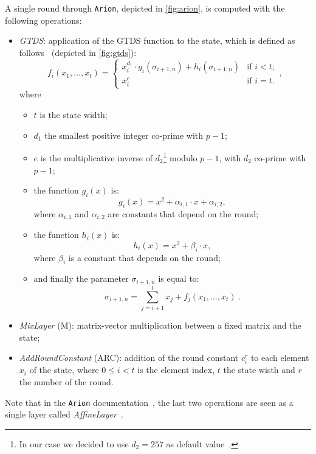 \documentclass[12pt, a4paper]{report}
\begin{document}
A single round through \texttt{Arion}, depicted in \autoref{fig:arion}, is computed with the following operations:
\begin{itemize}
  \item \textit{GTDS}: application of the GTDS function to the state, which is defined as follows~\cite[Def.~1]{arion} (depicted in \autoref{fig:gtds}):
    \begin{equation}
      f_i(x_1, \ldots, x_t) = \left\{
          \begin{array}{ll}
            x_i^{d_1} \cdot g_i(\sigma_{i+1, n}) + h_i(\sigma_{i+1, n}) & \text{if } i < t; \\
            x_i^{e} & \text{if } i = t.
          \end{array}
        \right. ,
      \label{eq:gtds}
    \end{equation}
    where
    \begin{itemize}
      \item $t$ is the state width;
      \item $d_1$ the smallest positive integer co-prime with $p-1$;
      \item $e$ is the multiplicative inverse of $d_2$\footnote{In our case we decided to use $d_2 = 257$ as default value~\cite[Tab.~2]{arion}.} modulo $p-1$, with $d_2$ co-prime with $p-1$;
      \item the function $g_i(x)$ is:
        \begin{equation}
          g_i(x) = x^2 + \alpha_{i,1} \cdot x + \alpha_{i,2} ,
          \label{eq:g}
        \end{equation}
        where $\alpha_{i,1}$ and $\alpha_{i,2}$ are constants that depend on the round;
      \item the function $h_i(x)$ is:
        \begin{equation}
          h_i(x) = x^2 + \beta_i \cdot x,
          \label{eq:h}
        \end{equation}
        where $\beta_i$ is a constant that depends on the round;
      \item and finally the parameter $\sigma_{i+1, n}$ is equal to:
        \begin{equation}
          \sigma_{i+1, n} = \sum_{j=i+1}^{t} x_j + f_j(x_1, \ldots, x_t)\ .
          \label{eq:theta}
        \end{equation}
    \end{itemize}
  \item \textit{MixLayer} (M): matrix-vector multiplication between a fixed matrix and the state;
  \item \textit{AddRoundConstant} (ARC): addition of the round constant $c^r_i$ to each element $x_i$ of the state, where $0 \le i < t$ is the element index, $t$ the state wisth and $r$ the number of the round.
\end{itemize}
\begin{note}
  Note that in the \texttt{Arion} documentation~\cite{arion}, the last two operations are seen as a single layer called \textit{AffineLayer}~\cite[Def.~3]{arion}.
\end{note}
\end{document}
